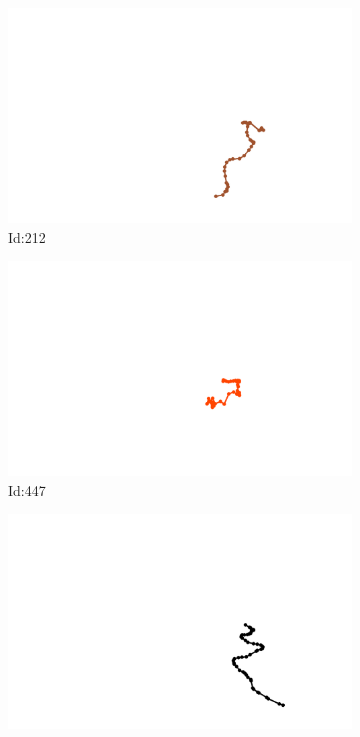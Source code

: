 \documentclass[12pt,twoside]{report}
\begin{document}
\begin{figure}
\centering
\begin{subfigure}[b]{0.20\textwidth}
\centering
\includegraphics[width=\textwidth]{../../trajectories/212.png}
\caption{Id:212}
\end{subfigure}
\begin{subfigure}[b]{0.20\textwidth}
\centering
\includegraphics[width=\textwidth]{../../trajectories/447.png}
\caption{Id:447}
\end{subfigure}
\begin{subfigure}[b]{0.20\textwidth}
\centering
\includegraphics[width=\textwidth]{../../trajectories/521.png}

\end{subfigure}
\end{figure}
\end{document}
